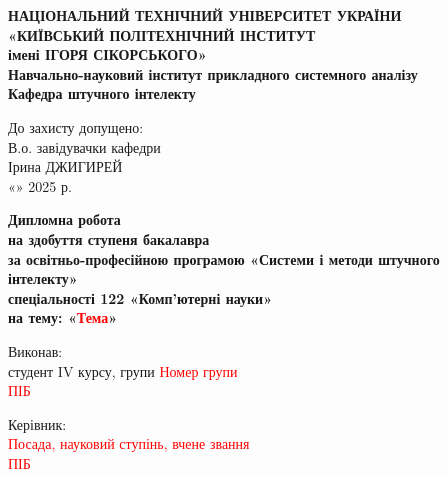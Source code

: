 \begin{titlepage}
\thispagestyle{empty}
\begin{spacing}{1}

\begin{center}
\textbf{НАЦІОНАЛЬНИЙ ТЕХНІЧНИЙ УНІВЕРСИТЕТ УКРАЇНИ}\\
\textbf{«КИЇВСЬКИЙ ПОЛІТЕХНІЧНИЙ ІНСТИТУТ\\
імені ІГОРЯ СІКОРСЬКОГО»}\\

\textbf{Навчально-науковий інститут прикладного системного аналізу\\
Кафедра штучного інтелекту}
\end{center}

\vspace{0.1cm}

\hfill
\begin{minipage}{0.4\textwidth}
До захисту допущено:\\
В.о. завідувачки кафедри\\
\underline{\hspace{2cm}} Ірина ДЖИГИРЕЙ\\
«\underline{\hspace{0.7cm}}» \underline{\hspace{2.8cm}} 2025 р.
\end{minipage}

\vspace{0.1cm}

\begin{center}
\textbf{\LARGE Дипломна робота}\\ 

\textbf{на здобуття ступеня бакалавра\\
за освітньо-професійною програмою «Системи і методи штучного інтелекту»\\
спеціальності 122 «Комп’ютерні науки»\\
на тему: «\textcolor{red}{Тема}»}
\end{center}

\vspace{0.05cm}

\noindent
Виконав:\\
студент IV курсу, групи \textcolor{red}{Номер групи}\\
\textcolor{red}{ПІБ} \hfill \underline{\hspace{4cm}}

\vspace{1ex}

\noindent
Керівник:\\
\textcolor{red}{Посада, науковий ступінь, вчене звання}\\
\textcolor{red}{ПІБ} \hfill \underline{\hspace{4cm}}


\end{spacing}
\end{titlepage}
